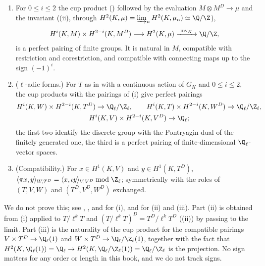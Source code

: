 \begin{theorem}\label{thm:galcoh:tate-local-duality}
\begin{enumerate}[label=(\roman*)]
\item For $0\le i\le2$ the cup product () followed by the evaluation $M\otimes M^D\to\mu$ and the invariant ((ii),
through $H^2(K,\mu)=\varinjlim_nH^2(K,\mu_n)\simeq\Q/\Z$),
\[
H^i(K,M)\times H^{2-i}(K,M^D)\longrightarrow H^2(K,\mu)\xrightarrow{\ \operatorname{inv}_K\ }\Q/\Z,
\]
is a perfect pairing of finite groups. It is natural in $M$, compatible with restriction and corestriction, and compatible with connecting maps up to the sign
$(-1)^i$.
\item ($\ell$-adic forms.) For $T$ as in  with a continuous action of $G_K$ and $0\le i\le2$, the cup products with the pairings of
(i) give perfect pairings
\begin{gather*}
H^i(K,W)\times H^{2-i}(K,T^D)\to\Q_\ell/\Z_\ell,\qquad H^i(K,T)\times H^{2-i}(K,W^D)\to\Q_\ell/\Z_\ell,\\
H^i(K,V)\times H^{2-i}(K,V^D)\to\Q_\ell ;
\end{gather*}
the first two identify the discrete group with the Pontryagin dual of the finitely generated one, the third is a perfect pairing of finite-dimensional
$\Q_\ell$-vector spaces.
\item (Compatibility.) For $x\in H^1(K,V)$ and $y\in H^1(K,T^D)$, $\langle\pi x,y\rangle_{W,T^D}=\langle x,\iota y\rangle_{V,V^D}\bmod\Z_\ell$; symmetrically with the roles of
$(T,V,W)$ and $(T^D,V^D,W^D)$ exchanged.
\end{enumerate}
\end{theorem}

\noindent We do not prove this; see \cite[Chapter II, Section 5]{SerreGaloisCoh}, \cite{TateDuality}, \cite[Chapter I, Section 2]{MilneADT} and
\cite[Chapter VII, Section 2]{NSW} for (i), and \cite[Section 1.4]{Rubin} for (ii) and (iii). Part (ii) is obtained from (i) applied to $T/\ell^kT$ and
$(T/\ell^kT)^D=T^D/\ell^kT^D$ ((ii)) by passing to the limit. Part (iii) is the naturality of the cup product for the
compatible pairings $V\times T^D\to\Q_\ell(1)$ and $W\times T^D\to\Q_\ell/\Z_\ell(1)$, together with the fact that $H^2(K,\Q_\ell(1))=\Q_\ell\to H^2(K,\Q_\ell/\Z_\ell(1))=\Q_\ell/\Z_\ell$ is the
projection. No sign matters for any order or length in this book, and we do not track signs.

